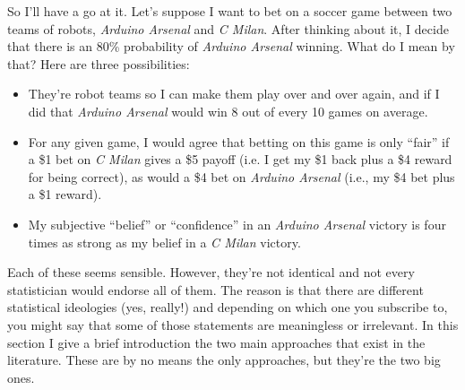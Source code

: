 So I'll have a go at it. Let's suppose I want to bet on a soccer game between two teams of robots, {\it Arduino Arsenal} and {\it C Milan}. After thinking about it, I decide that there is an 80\% probability of {\it Arduino Arsenal} winning. What do I mean by that? Here are three possibilities:
\begin{itemize}
\item They're robot teams so I can make them play over and over again, and if I did that {\it Arduino Arsenal} would win 8 out of every 10 games on average.
\item For any given game, I would agree that betting on this game is only ``fair'' if a \$1 bet on {\it C Milan} gives a \$5 payoff (i.e. I get my \$1 back plus a \$4 reward for being correct), as would a \$4 bet on {\it Arduino Arsenal} (i.e., my \$4 bet plus a \$1 reward). 
\item My subjective ``belief'' or ``confidence'' in an {\it Arduino Arsenal} victory is four times as strong as my belief in a {\it C Milan} victory.
\end{itemize}
Each of these seems sensible. However, they're not identical and not every statistician would endorse all of them. The reason is that there are different statistical ideologies (yes, really!) and depending on which one you subscribe to, you might say that some of those statements are meaningless or irrelevant. In this section I give a brief introduction the two main approaches that exist in the literature. These are by no means the only approaches, but they're the two big ones. 


